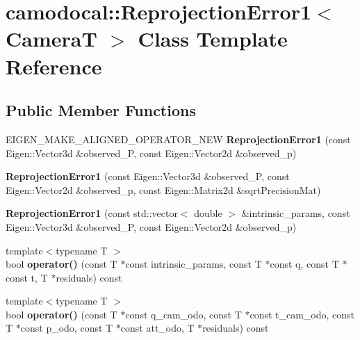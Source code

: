 \hypertarget{classcamodocal_1_1ReprojectionError1}{}\section{camodocal\+:\+:Reprojection\+Error1$<$ CameraT $>$ Class Template Reference}
\label{classcamodocal_1_1ReprojectionError1}
\subsection*{Public Member Functions}
\begin{DoxyCompactItemize}
\item 
\mbox{\label{classcamodocal_1_1ReprojectionError1_a07e09ab098f3cde8c20078aafc27851a}} 
E\+I\+G\+E\+N\+\_\+\+M\+A\+K\+E\+\_\+\+A\+L\+I\+G\+N\+E\+D\+\_\+\+O\+P\+E\+R\+A\+T\+O\+R\+\_\+\+N\+EW {\bfseries Reprojection\+Error1} (const Eigen\+::\+Vector3d \&observed\+\_\+P, const Eigen\+::\+Vector2d \&observed\+\_\+p)
\item 
\mbox{\label{classcamodocal_1_1ReprojectionError1_a2ec3c16008c34dc1cacff1d08f6146eb}} 
{\bfseries Reprojection\+Error1} (const Eigen\+::\+Vector3d \&observed\+\_\+P, const Eigen\+::\+Vector2d \&observed\+\_\+p, const Eigen\+::\+Matrix2d \&sqrt\+Precision\+Mat)
\item 
\mbox{\label{classcamodocal_1_1ReprojectionError1_a522a4978f8e924d138a660b416cd4254}} 
{\bfseries Reprojection\+Error1} (const std\+::vector$<$ double $>$ \&intrinsic\+\_\+params, const Eigen\+::\+Vector3d \&observed\+\_\+P, const Eigen\+::\+Vector2d \&observed\+\_\+p)
\item 
\mbox{\label{classcamodocal_1_1ReprojectionError1_a28835c8b5c50e798d173c556c9553d9b}} 
{\footnotesize template$<$typename T $>$ }\\bool {\bfseries operator()} (const T $\ast$const intrinsic\+\_\+params, const T $\ast$const q, const T $\ast$const t, T $\ast$residuals) const
\item 
\mbox{\label{classcamodocal_1_1ReprojectionError1_a1b012d6fbddaeb5d2b3ffddbcf62f9ef}} 
{\footnotesize template$<$typename T $>$ }\\bool {\bfseries operator()} (const T $\ast$const q\+\_\+cam\+\_\+odo, const T $\ast$const t\+\_\+cam\+\_\+odo, const T $\ast$const p\+\_\+odo, const T $\ast$const att\+\_\+odo, T $\ast$residuals) const
\end{DoxyCompactItemize}
